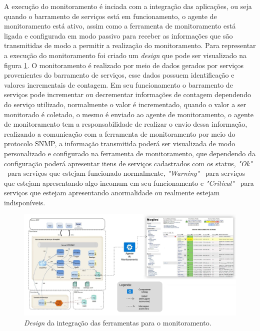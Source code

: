 A execução do monitoramento é inciada com a integração das aplicações, ou seja quando o barramento de serviços está em funcionamento, o agente de monitoramento está ativo, assim como a ferramenta de monitoramento está ligada e configurada em modo passivo para receber as informações que são transmitidas de modo a permitir a realização do monitoramento. Para representar a execução do monitoramento foi criado um \textit{design} que pode ser visualizado na figura \ref{fun:fig:arqtProjeto}. O monitoramento é realizado por meio de dados gerados por serviços provenientes do barramento de serviços, esse dados possuem identificação e valores incrementais de contagem. Em seu funcionamento o barramento de serviços pode incrementar ou decrementar informações de contagem dependendo do serviço utilizado, normalmente o valor é incrementado, quando o valor a ser monitorado é coletado, o mesmo é enviado ao agente de monitoramento, o agente de monitoramento tem a responsabilidade de realizar o envio dessa informação, realizando a comunicação com a ferramenta de monitoramento por meio do protocolo \acrshort{SNMP}, a informação transmitida poderá ser visualizada de modo personalizado e configurado na ferramenta de monitoramento, que dependendo da configuração poderá apresentar itens de serviços cadastrados com os status, \textit{"Ok"} \ para serviços que estejam funcionado normalmente, \textit{"Warning"} \  para serviços que estejam apresentando algo incomum em seu funcionamento e \textit{"Critical"} \ para serviços que estejam apresentando anormalidade ou realmente estejam indisponíveis.	 

\begin{figure}[H]
	\begin{center}
	\includegraphics[scale = 0.45]{img/arqtProjeto.jpeg}
	\caption{\textit{Design} da integração das ferramentas para o monitoramento.}
	\label{fun:fig:arqtProjeto}
	\end{center}
\end{figure}



